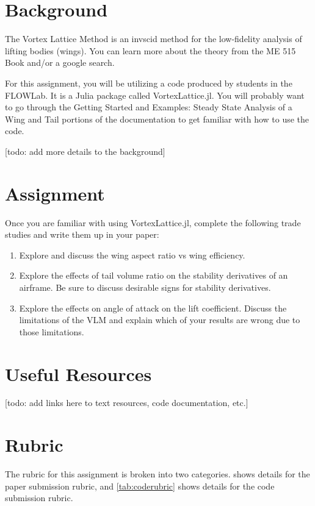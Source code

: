 \documentclass[12pt]{article}
\begin{document}
	
\section{Background}

	The Vortex Lattice Method is an invscid method for the low-fidelity analysis of lifting bodies (wings).
	You can learn more about the theory from the ME 515 Book and/or a google search.
	
	For this assignment, you will be utilizing a code produced by students in the FLOWLab.
	It is a Julia package called VortexLattice.jl.
	You will probably want to go through the Getting Started and Examples: Steady State Analysis of a Wing and Tail portions of the documentation to get familiar with how to use the code.
	
	[todo: add more details to the background]
	
\section{Assignment}
	Once you are familiar with using VortexLattice.jl, complete the following trade studies and write them up in your paper:
	
	\begin{enumerate}
		\item Explore and discuss the wing aspect ratio vs wing efficiency. 
		\item Explore the effects of tail volume ratio on the stability derivatives of an airframe. Be sure to discuss desirable signs for stability derivatives.
		\item Explore the effects on angle of attack on the lift coefficient. Discuss the limitations of the VLM and explain which of your results are wrong due to those limitations.
	\end{enumerate}





\section{Useful Resources}

[todo: add links here to text resources, code documentation, etc.]


\section{Rubric}

The rubric for this assignment is broken into two categories. 
 shows details for the paper submission rubric, and
\cref{tab:coderubric} shows details for the code submission rubric.
\end{document}
